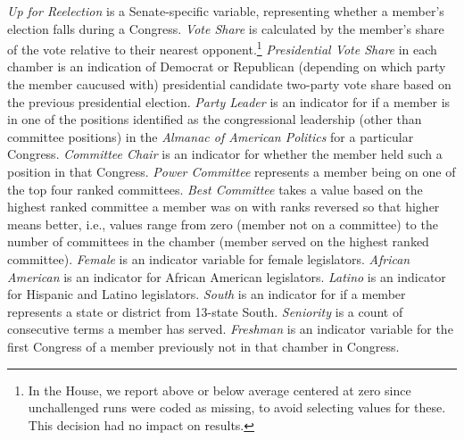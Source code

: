 \documentclass[12pt]{article}
\begin{document}
\textit{Up for Reelection} is a Senate-specific variable, representing whether
a member's election falls during a Congress.
\textit{Vote Share} is calculated by the member's share of the vote relative to
their nearest opponent.\footnote{
  \doublespacing\normalsize
  In the House, we report above or below average centered at zero since
  unchallenged runs were coded as missing, to avoid selecting values for these.
  This decision had no impact on results.}
\textit{Presidential Vote Share} in each chamber is an indication of Democrat or
Republican (depending on which party the member caucused with) presidential
candidate two-party vote share based on the previous presidential election.
\textit{Party Leader} is an indicator for if a member is in one of the
positions identified as the congressional leadership (other than committee
positions) in the \textit{Almanac of American Politics} for a particular
Congress.
\textit{Committee Chair} is an indicator for whether the member held such a
position in that Congress.
\textit{Power Committee} represents a member being on one of the top four ranked
committees.
\textit{Best Committee} takes a value based on the highest ranked committee a
member was on with ranks reversed so that higher means better, i.e., values
range from zero (member not on a committee) to the number of committees in the
chamber (member served on the highest ranked committee).
\textit{Female} is an indicator variable for female legislators.
\textit{African American} is an indicator for African American legislators.
\textit{Latino} is an indicator for Hispanic and Latino legislators.
\textit{South} is an indicator for if a member represents a state or district
from 13-state South.
\textit{Seniority} is a count of consecutive terms a member has served.
\textit{Freshman} is an indicator variable for the first Congress of a member
previously not in that chamber in Congress.
\end{document}
